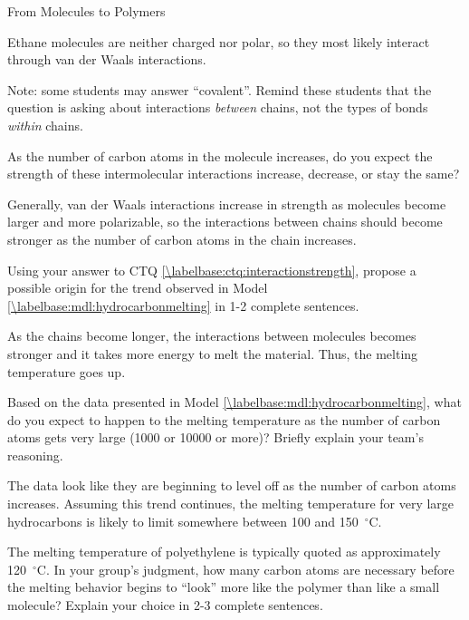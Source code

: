 \begin{activity}{From Molecules to Polymers}
\begin{ctqs}
		\begin{solution}[0.5in]
			Ethane molecules are neither charged nor polar, so they most likely interact through van der Waals interactions.
			
			Note: some students may answer ``covalent''.  Remind these students that the question is asking about interactions \emph{between} chains, not the types of bonds \emph{within} chains.
		\end{solution}
	
	\question As the number of carbon atoms in the molecule increases, do you expect the strength of these intermolecular interactions increase, decrease, or stay the same? \label{\labelbase:ctq:interactionstrength}
	
		\begin{solution}[0.5in]
			Generally, van der Waals interactions increase in strength as molecules become larger and more polarizable, so the interactions between chains should become stronger as the number of carbon atoms in the chain increases.
		\end{solution}
	
	\question Using your answer to CTQ \ref{\labelbase:ctq:interactionstrength}, propose a possible origin for the trend observed in Model \ref{\labelbase:mdl:hydrocarbonmelting} in 1-2 complete sentences.
	
		\begin{solution}[2in]
			As the chains become longer, the interactions between molecules becomes stronger and it takes more energy to melt the material.  Thus, the melting temperature goes up.
		\end{solution}
	
	\question Based on the data presented in Model \ref{\labelbase:mdl:hydrocarbonmelting}, what do you expect to happen to the melting temperature as the number of carbon atoms gets very large (1000 or 10000 or more)?  Briefly explain your team's reasoning.
	
		\begin{solution}[2in]
		
			The data look like they are beginning to level off as the number of carbon atoms increases.  Assuming this trend continues, the melting temperature for very large hydrocarbons is likely to limit somewhere between 100 and 150~${}^\circ$C. 
		\end{solution}
	
	\question The melting temperature of polyethylene is typically quoted as approximately 120~${}^\circ$C.  In your group's judgment, how many carbon atoms are necessary before the melting behavior begins to ``look'' more like the polymer than like a small molecule?  Explain your choice in 2-3 complete sentences. \label{\labelbase:ctq:npolymer}
	

\end{ctqs}
\end{activity}
